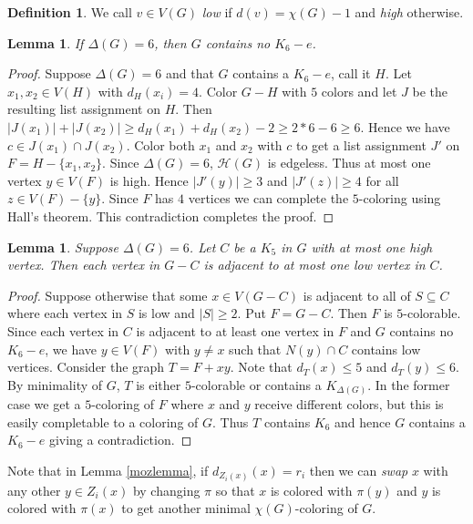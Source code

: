 \documentclass[11pt]{amsart}
\theoremstyle{plain}
\newtheorem{lem}[thm]{Lemma}
\theoremstyle{definition}
\newtheorem{defn}{Definition}
\theoremstyle{remark}
\begin{document}
\begin{defn}
We call $v \in V(G)$ \emph{low} if $d(v) = \chi(G) - 1$ and \emph{high} otherwise.
\end{defn}

\begin{lem}
If $\Delta(G) = 6$, then $G$ contains no $K_{6} - e$.
\end{lem}
\begin{proof}
Suppose $\Delta(G) = 6$ and that $G$ contains a $K_{6} - e$, call it $H$.  Let $x_1, x_2 \in V(H)$ with $d_H(x_i) = 4$.  Color $G - H$ with $5$ colors and let $J$ be the resulting list assignment on $H$.  Then
$|J(x_1)| + |J(x_2)| \geq d_H(x_1) + d_H(x_2) - 2 \geq 2*6 - 6 \geq 6$.  Hence we have $c \in J(x_1) \cap J(x_2)$.  Color both $x_1$ and $x_2$ with $c$ to get a list assignment $J'$ on $F = H - \{x_1,x_2\}$. Since $\Delta(G) = 6$, $\mathcal{H}(G)$ is edgeless.  Thus at most one vertex $y \in V(F)$ is high.  Hence $|J'(y)| \geq 3$ and $|J'(z)| \geq 4$ for all $z \in V(F) - \{y\}$.  Since $F$ has $4$ vertices we can complete the $5$-coloring using Hall's theorem.  This contradiction completes the proof.
\end{proof}

\begin{lem}\label{NoTwoHitter}
Suppose $\Delta(G) = 6$. Let $C$ be a $K_{5}$ in $G$ with at most one high vertex.  Then each vertex in $G - C$ is adjacent to at most one low vertex in $C$.
\end{lem}
\begin{proof}
Suppose otherwise that some $x \in V(G - C)$ is adjacent to all of $S \subseteq C$ where each vertex in $S$ is low and $|S| \geq 2$. Put $F = G - C$.  Then $F$ is $5$-colorable.  Since each vertex in $C$ is adjacent to at least one vertex in $F$ and $G$ contains no $K_{6} - e$, we have $y \in V(F)$  with $y \neq x$ such that $N(y) \cap C$ contains low vertices.  Consider the graph $T = F + xy$.  Note that $d_T(x) \leq 5$ and $d_T(y) \leq 6$.  By minimality of $G$, $T$ is either $5$-colorable or contains a $K_{\Delta(G)}$.  In the former case we get a $5$-coloring of $F$ where $x$ and $y$ receive different colors, but this is easily completable to a coloring of $G$.  Thus $T$ contains $K_{6}$ and hence $G$ contains a $K_{6} - e$ giving a contradiction.
\end{proof}

Note that in Lemma \ref{mozlemma}, if $d_{Z_i(x)}(x) = r_i$ then we can \emph{swap} $x$ with any other $y \in Z_i(x)$ by changing $\pi$ so that $x$ is colored with $\pi(y)$ and $y$ is colored with $\pi(x)$ to get another minimal $\chi(G)$-coloring of $G$.
\end{document}

